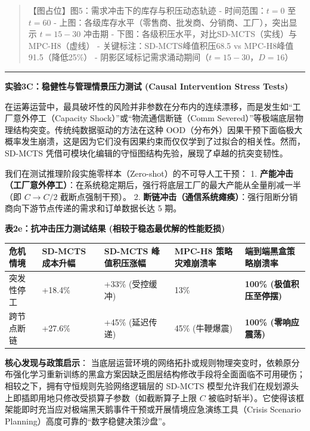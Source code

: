 \documentclass[UTF8]{ctexart}
\begin{document}
\begin{quote}
【图占位】图5：需求冲击下的库存与积压动态轨迹 - 时间范围：\(t=0\) 至
\(t=60\) - 上图：各级库存水平（零售商、批发商、分销商、工厂），突出显示
\(t=15-30\) 冲击期 -
下图：各级积压水平，对比SD-MCTS（实线）与MPC-H8（虚线） -
关键标注：SD-MCTS峰值积压68.5 vs MPC-H8峰值91.5（降低25\%） -
阴影区域标记需求涌动期间（\(t=15-30\)，\(D=16\)）
\end{quote}

\begin{center}\rule{0.5\linewidth}{0.4pt}\end{center}

\textbf{实验3C：稳健性与管理情景压力测试 (Causal Intervention Stress
Tests)}

在运筹运营中，最具破坏性的风险并非参数在分布内的连续漂移，而是发生如``工厂意外停工（Capacity
Shock）''或``物流通信断链（Comm
Severed）''等极端底层物理结构突变。传统纯数据驱动的方法在这种
OOD（分布外）因果干预下面临极大概率发生崩溃，这是因为它们没有因果约束而仅仅学到了过拟合的相关性。然而，SD-MCTS
凭借可模块化编辑的守恒图结构先验，展现了卓越的抗突变韧性。

我们在测试推理阶段实施零样本（Zero-shot）的不可导人工干预： 1.
\textbf{产能冲击（工厂意外停工）}：在系统稳定期后，强行将底层工厂的最大产能从全量削减一半（即
\(C \to C/2\) 截断点强制干预）。 2.
\textbf{断链冲击（通信系统瘫痪）}：强行阻断分销商向下游节点传递的需求和订单数据长达
5 期。

\textbf{表2e：抗冲击压力测试结果 (相较于稳态最优解的性能贬损)}

\begin{table}[h]
\centering
\begin{tabular}{p{2.5cm}p{2.8cm}p{3.2cm}p{3cm}p{3cm}}
\toprule
\textbf{危机情境} & \textbf{SD-MCTS 成本升幅} & \textbf{SD-MCTS 峰值积压涨幅} & \textbf{MPC-H8 策略灾难崩溃率} & \textbf{端到端黑盒策略崩溃率} \\
\midrule
突发性停工 & +18.4\% & +33\% (受控缓冲) & 13\% & \textbf{100\% (极值积压至停摆)} \\
跨节点断链 & +27.6\% & +45\% (延迟传递) & 45\% (牛鞭爆震) & \textbf{100\% (零响应震荡)} \\
\bottomrule
\end{tabular}
\end{table}

\textbf{核心发现与政策启示}：
当底层运营环境的网络拓扑或规则物理突变时，依赖原分布强化学习重新训练的黑盒方案因缺乏图层结构修改手段将全面面临不可用硬伤；相较之下，拥有守恒规则先验网络逻辑层的
SD-MCTS
模型允许我们在规划源头上即插即用地只修改受损算子参数（如截断算子上限
\(C\)
被临时斩半）。它使得该框架能即时充当应对极端黑天鹅事件干预或开展情境应急演练工具（Crisis
Scenario Planning）高度可靠的``数字稳健决策沙盘''。
\end{document}
